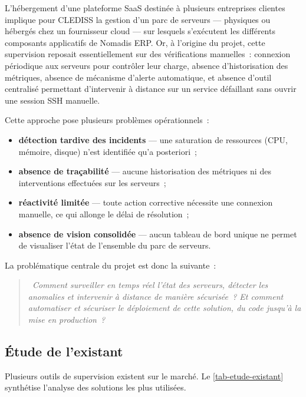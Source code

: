 L'hébergement d'une plateforme SaaS destinée à plusieurs entreprises clientes implique pour CLEDISS la gestion d'un parc de serveurs — physiques ou hébergés chez un fournisseur cloud — sur lesquels s'exécutent les différents composants applicatifs de Nomadis ERP. Or, à l'origine du projet, cette supervision reposait essentiellement sur des vérifications manuelles~: connexion périodique aux serveurs pour contrôler leur charge, absence d'historisation des métriques, absence de mécanisme d'alerte automatique, et absence d'outil centralisé permettant d'intervenir à distance sur un service défaillant sans ouvrir une session SSH manuelle.

Cette approche pose plusieurs problèmes opérationnels~:

\begin{itemize}
  \item \textbf{détection tardive des incidents} — une saturation de ressources (CPU, mémoire, disque) n'est identifiée qu'a posteriori~;
  \item \textbf{absence de traçabilité} — aucune historisation des métriques ni des interventions effectuées sur les serveurs~;
  \item \textbf{réactivité limitée} — toute action corrective nécessite une connexion manuelle, ce qui allonge le délai de résolution~;
  \item \textbf{absence de vision consolidée} — aucun tableau de bord unique ne permet de visualiser l'état de l'ensemble du parc de serveurs.
\end{itemize}

La problématique centrale du projet est donc la suivante~:

\begin{quote}
\itshape
\guillemotleft~Comment surveiller en temps réel l'état des serveurs, détecter les anomalies et intervenir à distance de manière sécurisée~? Et comment automatiser et sécuriser le déploiement de cette solution, du code jusqu'à la mise en production~?~\guillemotright
\end{quote}

\subsection{Étude de l'existant}

Plusieurs outils de supervision existent sur le marché. Le \cref{tab-etude-existant} synthétise l'analyse des solutions les plus utilisées.

